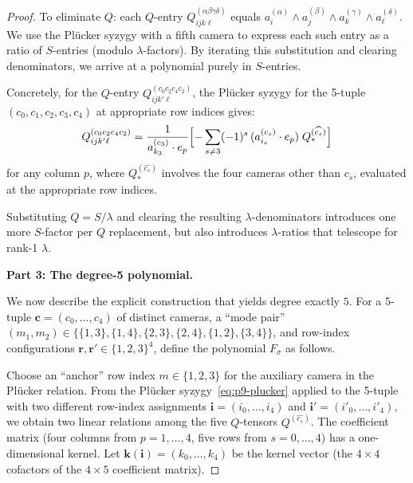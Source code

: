 \begin{proof}
To eliminate $Q$: each $Q$-entry $Q^{(\alpha\beta\gamma\delta)}_{ijk\ell}$
equals $a^{(\alpha)}_i\wedge a^{(\beta)}_j\wedge a^{(\gamma)}_k\wedge a^{(\delta)}_\ell$.
We use the Pl\"ucker syzygy with a fifth camera to express each such entry as a
ratio of $S$-entries (modulo $\lambda$-factors). By iterating this
substitution and clearing denominators, we arrive at a polynomial purely
in $S$-entries.

Concretely, for the $Q$-entry $Q^{(c_0 c_2 c_4 c_2)}_{ijk'\ell}$, the
Pl\"ucker syzygy for the 5-tuple $(c_0,c_1,c_2,c_3,c_4)$ at appropriate
row indices gives:
\begin{equation}\label{eq:p9-Qelim}
  Q^{(c_0 c_2 c_4 c_2)}_{ijk'\ell} = \frac{1}{a^{(c_3)}_{k_3}\cdot e_p}
  \Bigl[-\sum_{s\neq 3} (-1)^{s}\,(a^{(c_s)}_{i_s}\cdot e_p)\;
  Q^{(\widehat{c_s})}_{*}\Bigr]
\end{equation}
for any column $p$, where $Q^{(\widehat{c_s})}_{*}$ involves the four cameras
other than $c_s$, evaluated at the appropriate row indices.

Substituting $Q = S/\lambda$ and clearing the resulting $\lambda$-denominators
introduces one more $S$-factor per $Q$ replacement, but also introduces
$\lambda$-ratios that telescope for rank-1 $\lambda$.

\medskip
\textbf{Part 3: The degree-5 polynomial.}

We now describe the explicit construction that yields degree exactly $5$.
For a 5-tuple $\mathbf{c} = (c_0,\ldots,c_4)$ of distinct cameras,
a ``mode pair'' $(m_1,m_2)\in\{\{1,3\},\{1,4\},\{2,3\},\{2,4\},\{1,2\},\{3,4\}\}$,
and row-index configurations $\mathbf{r},\mathbf{r}'\in\{1,2,3\}^4$, define
the polynomial $F_\sigma$ as follows.

Choose an ``anchor'' row index $m\in\{1,2,3\}$ for the auxiliary camera in
the Pl\"ucker relation. From the Pl\"ucker syzygy~\eqref{eq:p9-plucker}
applied to the 5-tuple with two different row-index assignments
$\mathbf{i} = (i_0,\ldots,i_4)$ and $\mathbf{i}' = (i'_0,\ldots,i'_4)$,
we obtain two linear relations among the five $Q$-tensors $Q^{(\widehat{c_s})}$.
The coefficient matrix (four columns from $p=1,\ldots,4$, five rows from $s=0,\ldots,4$)
has a one-dimensional kernel. Let $\mathbf{k}(\mathbf{i}) = (k_0,\ldots,k_4)$ be
the kernel vector (the $4\times 4$ cofactors of the $4\times 5$ coefficient matrix).


\end{proof}
